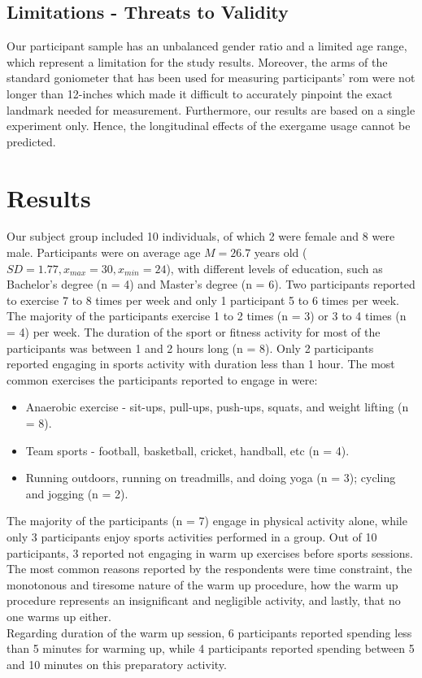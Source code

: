 \subsection{Limitations - Threats to Validity}
Our participant sample has an unbalanced gender ratio and a limited age range, which represent a limitation for the study results. Moreover, the arms of the standard goniometer that has been used for measuring participants' \acrshort{rom} were not longer than 12-inches which made it difficult to accurately pinpoint the exact landmark needed for measurement. Furthermore, our results are based on a single experiment only. Hence, the longitudinal effects of the exergame usage cannot be predicted. 
\section{Results}
Our subject group included 10 individuals, of which 2 were female and 8 were male. Participants were on average age \begin{math}M = 26.7\end{math} years old (\begin{math}SD= 1.77,  x_{max}=30 ,x_{min}= 24 \end{math}), with different levels of education, such as Bachelor's degree (n = 4) and Master's degree (n = 6). Two participants reported to exercise 7 to 8 times per week and only 1 participant 5 to 6 times per week. The majority of the participants exercise 1 to 2 times (n = 3) or 3 to 4 times (n = 4) per week. The duration of the sport or fitness activity for most of the participants was between 1 and 2 hours long (n = 8). Only 2 participants reported engaging in sports activity with duration less than 1 hour. The most common exercises the participants reported to engage in were:
\begin{itemize}
\item Anaerobic exercise - sit-ups, pull-ups, push-ups, squats, and weight lifting (n = 8).
\item Team sports - football, basketball, cricket, handball, etc (n = 4).
\item Running outdoors, running on treadmills, and doing yoga (n = 3); cycling and jogging (n = 2).
\end{itemize}
The majority of the participants (n = 7) engage in physical activity alone, while only 3 participants enjoy sports activities performed in a group. Out of 10 participants, 3 reported not engaging in warm up exercises before sports sessions. The most common reasons reported by the respondents were time constraint, the monotonous and tiresome nature of the warm up procedure, how the warm up procedure represents an insignificant and negligible activity, and lastly, that no one warms up either.\\ Regarding duration of the warm up session, 6 participants reported spending less than 5 minutes for warming up, while 4 participants reported spending between 5 and 10 minutes on this preparatory activity.\\
